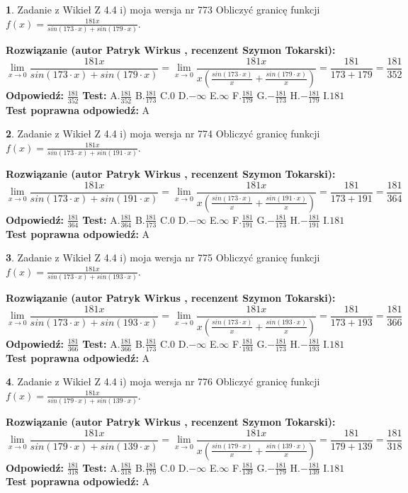 \documentclass[12pt, a4paper]{article}
\theoremstyle{definition} %
\newtheorem{zad}{}
\newcommand{\zadStart}[1]{\begin{zad}#1\newline}
\newcommand{\zadStop}{\end{zad}}
\newcommand{\rozwStart}[2]{\noindent \textbf{Rozwiązanie (autor #1 , recenzent #2): }\newline}
\newcommand{\rozwStop}{\newline}
\newcommand{\odpStart}{\noindent \textbf{Odpowiedź:}\newline}
\newcommand{\odpStop}{\newline}
\newcommand{\testStart}{\noindent \textbf{Test:}\newline}
\newcommand{\testStop}{\newline}
\newcommand{\kluczStart}{\noindent \textbf{Test poprawna odpowiedź:}\newline}
\newcommand{\kluczStop}{\newline}
\begin{document}
\zadStart{Zadanie z Wikieł Z 4.4 i) moja wersja nr 773}
Obliczyć granicę funkcji $f(x)=\frac{181x}{sin(173\cdot x) +sin(179\cdot x)}$.
\zadStop
\rozwStart{Patryk Wirkus}{Szymon Tokarski}
$$\lim\limits_{x\to 0}\frac{181x}{sin(173\cdot x) +sin(179\cdot x)}=\lim\limits_{x\to 0}\frac{181x}{x(\frac{sin(173\cdot x)}{x}+\frac{sin(179\cdot x)}{x})}=\frac{181}{173+179} = \frac{181}{352}$$
\rozwStop
\odpStart
$\frac{181}{352}$
\odpStop
\testStart
A.$\frac{181}{352}$
B.$\frac{181}{173}$
C.$0$
D.$-\infty$
E.$\infty$
F.$\frac{181}{179}$
G.$-\frac{181}{173}$
H.$-\frac{181}{179}$
I.$181$
\testStop
\kluczStart
A
\kluczStop



\zadStart{Zadanie z Wikieł Z 4.4 i) moja wersja nr 774}
Obliczyć granicę funkcji $f(x)=\frac{181x}{sin(173\cdot x) +sin(191\cdot x)}$.
\zadStop
\rozwStart{Patryk Wirkus}{Szymon Tokarski}
$$\lim\limits_{x\to 0}\frac{181x}{sin(173\cdot x) +sin(191\cdot x)}=\lim\limits_{x\to 0}\frac{181x}{x(\frac{sin(173\cdot x)}{x}+\frac{sin(191\cdot x)}{x})}=\frac{181}{173+191} = \frac{181}{364}$$
\rozwStop
\odpStart
$\frac{181}{364}$
\odpStop
\testStart
A.$\frac{181}{364}$
B.$\frac{181}{173}$
C.$0$
D.$-\infty$
E.$\infty$
F.$\frac{181}{191}$
G.$-\frac{181}{173}$
H.$-\frac{181}{191}$
I.$181$
\testStop
\kluczStart
A
\kluczStop



\zadStart{Zadanie z Wikieł Z 4.4 i) moja wersja nr 775}
Obliczyć granicę funkcji $f(x)=\frac{181x}{sin(173\cdot x) +sin(193\cdot x)}$.
\zadStop
\rozwStart{Patryk Wirkus}{Szymon Tokarski}
$$\lim\limits_{x\to 0}\frac{181x}{sin(173\cdot x) +sin(193\cdot x)}=\lim\limits_{x\to 0}\frac{181x}{x(\frac{sin(173\cdot x)}{x}+\frac{sin(193\cdot x)}{x})}=\frac{181}{173+193} = \frac{181}{366}$$
\rozwStop
\odpStart
$\frac{181}{366}$
\odpStop
\testStart
A.$\frac{181}{366}$
B.$\frac{181}{173}$
C.$0$
D.$-\infty$
E.$\infty$
F.$\frac{181}{193}$
G.$-\frac{181}{173}$
H.$-\frac{181}{193}$
I.$181$
\testStop
\kluczStart
A
\kluczStop



\zadStart{Zadanie z Wikieł Z 4.4 i) moja wersja nr 776}
Obliczyć granicę funkcji $f(x)=\frac{181x}{sin(179\cdot x) +sin(139\cdot x)}$.
\zadStop
\rozwStart{Patryk Wirkus}{Szymon Tokarski}
$$\lim\limits_{x\to 0}\frac{181x}{sin(179\cdot x) +sin(139\cdot x)}=\lim\limits_{x\to 0}\frac{181x}{x(\frac{sin(179\cdot x)}{x}+\frac{sin(139\cdot x)}{x})}=\frac{181}{179+139} = \frac{181}{318}$$
\rozwStop
\odpStart
$\frac{181}{318}$
\odpStop
\testStart
A.$\frac{181}{318}$
B.$\frac{181}{179}$
C.$0$
D.$-\infty$
E.$\infty$
F.$\frac{181}{139}$
G.$-\frac{181}{179}$
H.$-\frac{181}{139}$
I.$181$
\testStop
\kluczStart
A
\kluczStop
\end{document}
